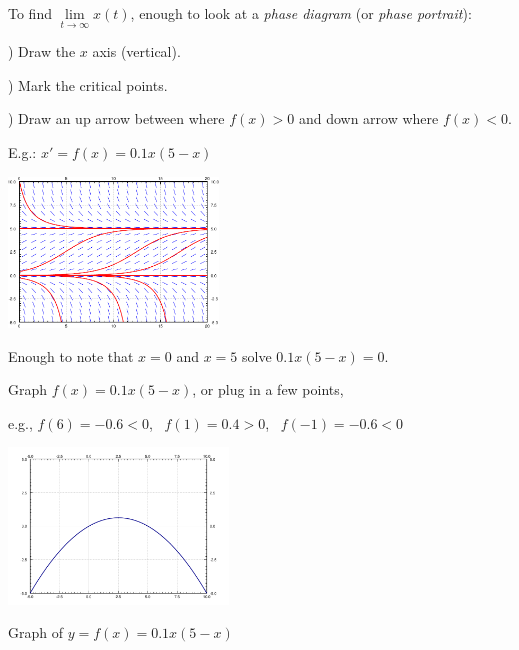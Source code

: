 \documentclass[10pt,aspectratio=169]{beamer}
\begin{document}
\begin{frame}
To find $\lim\limits_{t \to \infty} x(t)$, enough to look at a \emph{phase diagram} (or \emph{phase portrait}):

) Draw the $x$ axis (vertical).

) Mark the critical points.

) Draw an up arrow between where $f(x) > 0$ and down arrow where $f(x) <
0$.

\medskip
\pause

E.g.: $x' = f(x) = 0.1x(5-x)$

\bigskip
\pause


\pause
\vspace*{-1.49in}

\hspace*{1in} \includegraphics[width=2.2in]{../figures/2-2-logistic}

\medskip
\pause

Enough to note that $x=0$ and $x=5$ solve $0.1x(5-x)=0$.

\pause
Graph $f(x) = 0.1x(5-x)$,
\pause
or plug in a few points,

\pause
e.g.,
$f(6) = -0.6 < 0$,
\pause 
~$f(1) = 0.4 > 0$,
\pause
~$f(-1) = -0.6 < 0$

\pause
\vspace*{-1.8in}
\hspace*{3.35in}\includegraphics[width=2.3in]{figures/01x5mx}

\hspace*{3.5in} {\small Graph of $y=f(x)=0.1x(5-x)$}

\end{frame}
\end{document}
